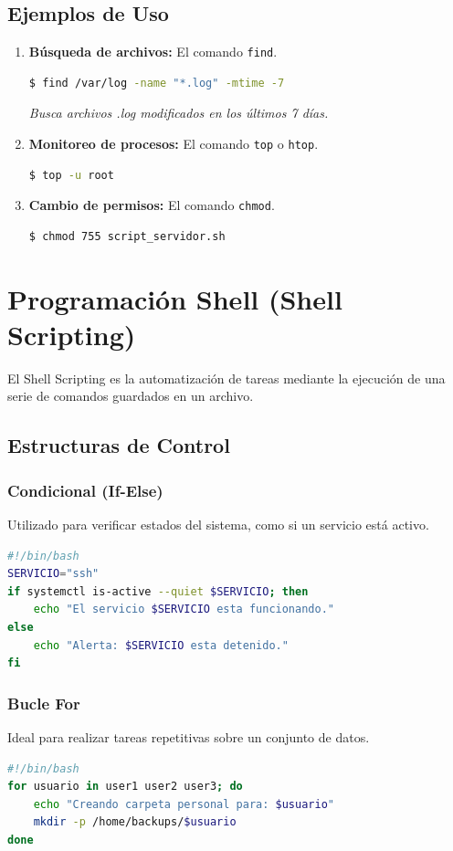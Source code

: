 \documentclass[a4paper,12pt]{article}
\begin{document}
\subsection{Ejemplos de Uso}
\begin{enumerate}
    \item \textbf{Búsqueda de archivos:} El comando \texttt{find}.
    \begin{lstlisting}[language=bash]
    $ find /var/log -name "*.log" -mtime -7
    \end{lstlisting}
    \textit{Busca archivos .log modificados en los últimos 7 días.}

    \item \textbf{Monitoreo de procesos:} El comando \texttt{top} o \texttt{htop}.
    \begin{lstlisting}[language=bash]
    $ top -u root
    \end{lstlisting}

    \item \textbf{Cambio de permisos:} El comando \texttt{chmod}.
    \begin{lstlisting}[language=bash]
    $ chmod 755 script_servidor.sh
    \end{lstlisting}
\end{enumerate}

\section{Programación Shell (Shell Scripting)}
El Shell Scripting es la automatización de tareas mediante la ejecución de una serie de comandos guardados en un archivo.

\subsection{Estructuras de Control}

\subsubsection{Condicional (If-Else)}
Utilizado para verificar estados del sistema, como si un servicio está activo.
\begin{lstlisting}[language=bash]
#!/bin/bash
SERVICIO="ssh"
if systemctl is-active --quiet $SERVICIO; then
    echo "El servicio $SERVICIO esta funcionando."
else
    echo "Alerta: $SERVICIO esta detenido."
fi
\end{lstlisting}

\subsubsection{Bucle For}
Ideal para realizar tareas repetitivas sobre un conjunto de datos.
\begin{lstlisting}[language=bash]
#!/bin/bash
for usuario in user1 user2 user3; do
    echo "Creando carpeta personal para: $usuario"
    mkdir -p /home/backups/$usuario
done
\end{lstlisting}
\end{document}
